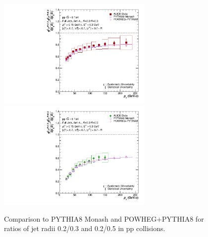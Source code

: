 \documentclass[ALICE]{ALICE_analysis_notes}
\newcommand{\pp}{pp\xspace}
\begin{document}
\begin{figure}
    \centering
    \begin{multicols}{2}
            \includegraphics[width=7.5cm]{figures/MCGen/MCComp_Ratio_R0302_nooutlier.pdf}
        \vfill\null
        \columnbreak
            \includegraphics[width=7.5cm]{figures/MCGen/MCComp_Ratio_R0502_nooutlier.pdf}
        \vfill\null
    \end{multicols}
    \caption{Comparison to PYTHIA8 Monash and POWHEG+PYTHIA8 for ratios of jet radii 0.2/0.3 and 0.2/0.5 in \pp collisions.}
    \label{fig:MCGen_Ratio}
\end{figure}
\end{document}
